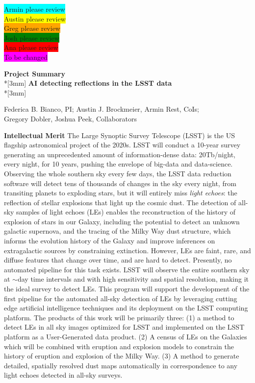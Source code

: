 \documentclass{proposalnsf}
\newcommand{\armin}[1]{\colorbox{cyan}{#1}}
\newcommand{\austin}[1]{\colorbox{yellow}{#1}}
\newcommand{\greg}[1]{\colorbox{orange}{#1}}
\newcommand{\josh}[1]{\colorbox{green}{#1}}
\newcommand{\ana}[1]{\colorbox{red}{#1}}
\newcommand{\changeit}[1]{\colorbox{magenta}{#1}}
\begin{document}
{\LARGE{
\noindent
\armin{Armin please review}\\
\austin{Austin please review}\\
\greg{Greg please review}\\
\josh{Josh please review}\\
\ana{Ana please review}\\
\changeit{To be changed}}}

\clearpage
\begin{center}
{\Large{\bf Project Summary}}\\*[3mm]
{\bf AI detecting reflections in the LSST data} \\*[3mm]

Federica B.  Bianco, PI; 
Austin J.  Brockmeier, 
Armin Rest, CoIs; \\
Gregory Dobler, 
Joshua Peek, Collaborators
\end{center}

\noindent
{\bf Intellectual Merit} The Large Synoptic Survey Telescope (LSST) is the US flagship astronomical project of the 2020s.   LSST will conduct a 10-year survey generating an unprecedented amount of information-dense data: 20Tb/night, every night, for 10 years, pushing the envelope of big-data and data-science.   Observing the whole southern sky every few days, the LSST data reduction software will detect tens of thousands of changes in the sky every night, from transiting planets to exploding stars, but it will entirely miss \emph{light echoes}: the reflection of stellar explosions that light up the cosmic dust.   The detection of all-sky samples of light echoes (LEs) enables the reconstruction of the history of explosion of stars in our Galaxy, including the potential to detect an unknown galactic supernova, and the tracing of the Milky Way dust structure, which informs the evolution history of the Galaxy and improve inferences on extragalactic sources by constraining extinction.  However, LEs are faint, rare, and diffuse features that change over time, and are hard to detect.  Presently, no automated pipeline for this task exists.  LSST will observe the entire southern sky at $\sim$day time intervals and with high sensitivity and spatial resolution, making it the ideal survey to detect LEs.  This program will support the development of the first pipeline for the automated all-sky detection of LEs by leveraging cutting edge artificial intelligence techniques and its deployment on the LSST computing platform.  The products of this work will be primarily three: (1) a method to detect LEs in all sky images optimized for LSST and implemented on the LSST platform as a User-Generated data product. (2) A census of LEs on the Galaxies which will be combined with eruption and explosion models to constrain the history of eruption and explosion of the Milky Way. (3) A method to generate detailed, spatially resolved dust maps automatically in correspondence to any light echoes detected in all-sky surveys.
\end{document}
